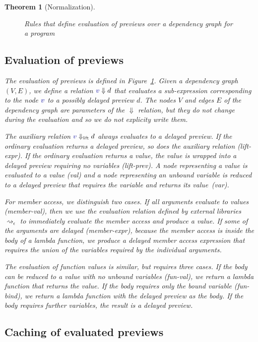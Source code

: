 \documentclass[acmsmall,anonymous,fleqn]{acmart}\settopmatter{printfolios=false,printccs=false,printacmref=false}
\newcounter{thc}
\theoremstyle{plain}
\newtheorem{theorem}[thc]{Theorem}
\theoremstyle{definition}
\newcommand{\ident}[1]{\textnormal{\textcolor{idclr}{\sffamily #1}}}
\newcommand{\bndclr}[1]{\textcolor{kvdclr}{#1}}
\newcommand{\rname}[1]{{\sffamily\small(#1)}}
\begin{document}
\begin{theorem}[Normalization]
\begin{figure}[b]
\caption{Rules that define evaluation of previews over a dependency graph for a program}
\label{fig:eval}
\end{figure}


\subsection{Evaluation of previews}
The evaluation of previews is defined in Figure~\ref{fig:eval}. Given a dependency graph $(V, E)$,
we define a relation $\bndclr{v}\Downarrow d$ that evaluates a sub-expression corresponding to
the node $\bndclr{v}$ to a possibly delayed preview $d$. The nodes $V$ and edges $E$ of the
dependency graph are parameters of the $\Downarrow$ relation, but they do not change during the
evaluation and so we do not explicity write them.

The auxiliary relation $\bndclr{v}\Downarrow_{\ident{lift}} d$ always evaluates
to a delayed preview. If the ordinary evaluation returns a delayed preview, so does the auxiliary
relation \rname{lift-expr}. If the ordinary evaluation returns a value, the value is wrapped
into a delayed preview requiring no variables \rname{lift-prev}.
%
A node representing a value is evaluated to a value \rname{val} and a node representing
an unbound variable is reduced to a delayed preview that requires the variable and returns its
value~\rname{var}.

For member access, we distinguish two cases. If all arguments evaluate to values \rname{member-val},
then we use the evaluation relation defined by external libraries $\rightsquigarrow_\epsilon$ to
immediately evaluate the member access and produce a value. If some of the arguments are
delayed \rname{member-expr}, because the member access is inside the body of a lambda function,
we produce a delayed member access expression that requires the union of the variables
required by the individual arguments.

The evaluation of function values is similar, but requires three cases. If the body can
be reduced to a value with no unbound variables \rname{fun-val}, we return a lambda function that
returns the value. If the body requires only the bound variable \rname{fun-bind}, we return a
lambda function with the delayed preview as the body. If the body requires further variables,
the result is a delayed preview.

\subsection{Caching of evaluated previews}
\label{sec:previews-cache}


\end{theorem}
\end{document}
